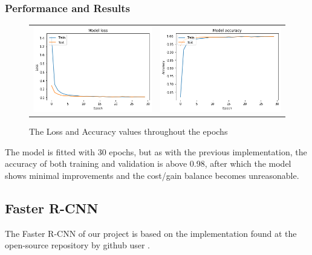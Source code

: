 \documentclass[12pt, landscape]{article}
\begin{document}
\begin{multicols}{3}
\subsubsection{Performance and Results}
\begin{figure}[H]
    \centering
    \begin{tabular}{cc}
    \includegraphics[scale=0.45]{Kresult1.png}&
    \includegraphics[scale=0.45]{Kresult.png}\\
    \end{tabular}
    \caption{The Loss and Accuracy values throughout the epochs}
    \label{fig:CNNKaccuracy}
\end{figure}
The model is fitted with 30 epochs, but as with the previous implementation, the
accuracy of both training and validation is above 0.98, after which the model
shows minimal improvements and the cost/gain balance becomes unreasonable.

\subsection{Faster R-CNN}
The Faster R-CNN of our project is based on the implementation found at the
open-source repository by github user \citep[Haxothermic]{Haxothermic}. 

\end{multicols}
\end{document}
